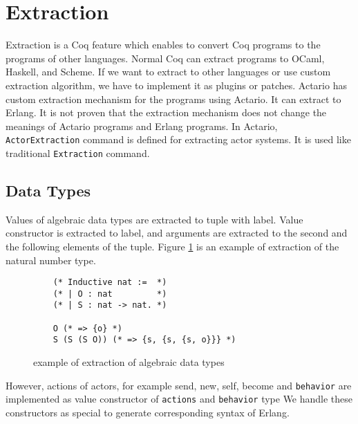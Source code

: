 \section{Extraction}
\label{sec:extraction}

Extraction is a Coq feature which enables to convert Coq programs to the programs of other languages.
Normal Coq can extract programs to OCaml, Haskell, and Scheme.
If we want to extract to other languages or use custom extraction algorithm, we have to implement it as plugins or patches.
Actario has custom extraction mechanism for the programs using Actario.
It can extract to Erlang.
It is not proven that the extraction mechanism does not change the meanings of Actario programs and Erlang programs.
In Actario, \lstinline|ActorExtraction| command is defined for extracting actor systems.
It is used like traditional \lstinline|Extraction| command.

\subsection{Data Types}

Values of algebraic data types are extracted to tuple with label.
Value constructor is extracted to label, and arguments are extracted to the second and the following elements of the tuple.
Figure \ref{coq:adt} is an example of extraction of the natural number type.

\begin{figure}[t]
  \begin{lstlisting}
    (* Inductive nat :=  *)
    (* | O : nat         *)
    (* | S : nat -> nat. *)

    O (* => {o} *)
    S (S (S O)) (* => {s, {s, {s, o}}} *)
  \end{lstlisting}
  \caption{example of extraction of algebraic data types}\label{coq:adt}
\end{figure}

However, actions of actors, for example \textsf{send}, \textsf{new}, \textsf{self}, \textsf{become} and \texttt{behavior} are implemented as value constructor of \texttt{actions} and \texttt{behavior} type
We handle these constructors as special to generate corresponding syntax of Erlang.


